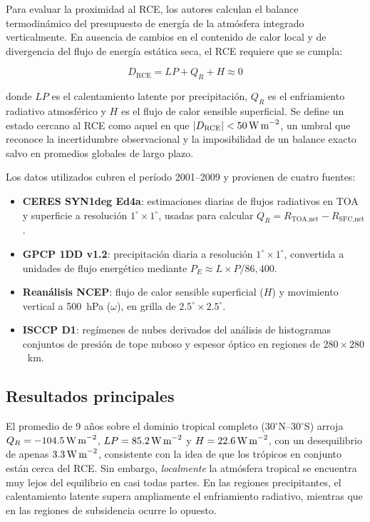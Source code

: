 \documentclass[12pt, a4paper]{article}
\begin{document}
Para evaluar la proximidad al RCE, los autores calculan el balance termodinámico del presupuesto de energía de la atmósfera integrado verticalmente. En ausencia de cambios en el contenido de calor local y de divergencia del flujo de energía estática seca, el RCE requiere que se cumpla:

\begin{equation}
	D_{\text{RCE}} = LP + Q_R + H \approx 0
\end{equation}

\noindent donde $LP$ es el calentamiento latente por precipitación, $Q_R$ es el enfriamiento radiativo atmosférico y $H$ es el flujo de calor sensible superficial. Se define un estado cercano al RCE como aquel en que $|D_{\text{RCE}}| < 50\,\text{W\,m}^{-2}$, un umbral que reconoce la incertidumbre observacional y la imposibilidad de un balance exacto salvo en promedios globales de largo plazo.

Los datos utilizados cubren el período 2001--2009 y provienen de cuatro fuentes:

\begin{itemize}
	\item \textbf{CERES SYN1deg Ed4a}: estimaciones diarias de flujos radiativos en TOA y superficie a resolución $1^\circ \times 1^\circ$, usadas para calcular $Q_R = R_{\text{TOA,net}} - R_{\text{SFC,net}}$.
	\item \textbf{GPCP 1DD v1.2}: precipitación diaria a resolución $1^\circ \times 1^\circ$, convertida a unidades de flujo energético mediante $P_E \approx L \times P / 86{,}400$.
	\item \textbf{Reanálisis NCEP}: flujo de calor sensible superficial ($H$) y movimiento vertical a 500~hPa ($\omega$), en grilla de $2.5^\circ \times 2.5^\circ$.
	\item \textbf{ISCCP D1}: regímenes de nubes derivados del análisis de histogramas conjuntos de presión de tope nuboso y espesor óptico en regiones de $280 \times 280$~km.
\end{itemize}

\subsection{Resultados principales}

El promedio de 9 años sobre el dominio tropical completo ($30^\circ$N--$30^\circ$S) arroja
$Q_R = -104.5\,\text{W\,m}^{-2}$, $LP = 85.2\,\text{W\,m}^{-2}$ y $H = 22.6\,\text{W\,m}^{-2}$,
con un desequilibrio de apenas $3.3\,\text{W\,m}^{-2}$, consistente con la idea de que los
trópicos en conjunto están cerca del RCE. Sin embargo, \emph{localmente} la atmósfera tropical
se encuentra muy lejos del equilibrio en casi todas partes. En las regiones precipitantes,
el calentamiento latente supera ampliamente el enfriamiento radiativo, mientras que en las
regiones de subsidencia ocurre lo opuesto.
\end{document}
